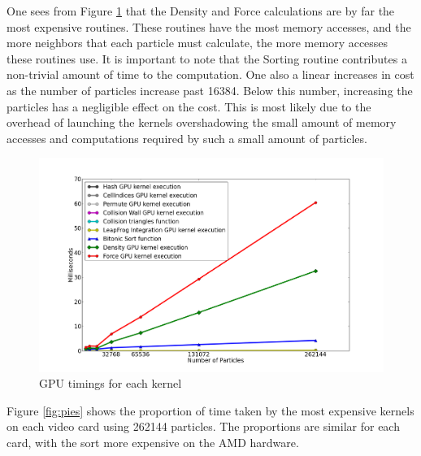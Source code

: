 \newpage
One sees from Figure \ref{fig:kernel_time} that the Density and Force calculations are by far
the most expensive routines. These routines have the most memory accesses, and
the more neighbors that each particle must calculate, the more memory accesses
these routines use. It is important to note that the Sorting routine
contributes a non-trivial amount of time to the computation.
One also a linear increases in cost as the number of particles increase past
16384. Below this number, increasing the particles has a negligible effect on
the cost. This is most likely due to the overhead of launching the kernels
overshadowing the small amount of memory accesses and computations required by
such a small amount of particles. 



\begin{figure}[!htc]
 		\centering
		\includegraphics[width=\columnwidth]{figures/nv_kernel_num.png}
        \caption{ GPU timings for each kernel }
        \label{fig:kernel_time}
\end{figure}


Figure \ref{fig:pies} shows the proportion of time taken by the most expensive
kernels on each video card using 262144 particles. The proportions are similar
for each card, with the sort more expensive on the AMD hardware.

